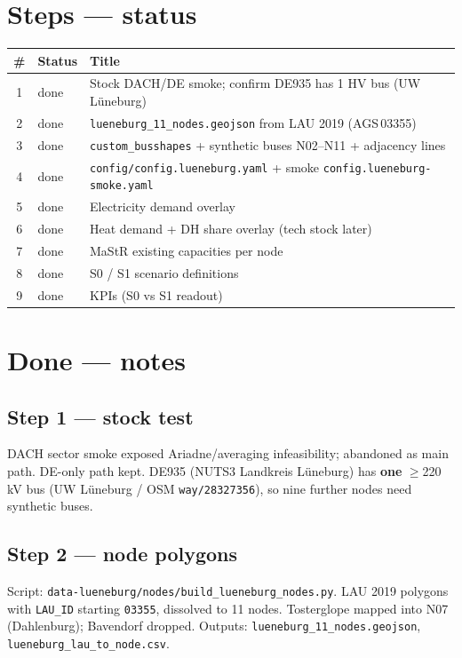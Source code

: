 \documentclass[11pt,a4paper]{article}
\begin{document}
\section{Steps --- status}

\begin{center}
\begin{tabular}{@{}clp{8cm}@{}}
\toprule
\# & Status & Title \\
\midrule
1 & done & Stock DACH/DE smoke; confirm DE935 has 1 HV bus (UW Lüneburg) \\
2 & done & \texttt{lueneburg\_11\_nodes.geojson} from LAU 2019 (AGS\,03355) \\
3 & done & \texttt{custom\_busshapes} + synthetic buses N02--N11 + adjacency lines \\
4 & done & \texttt{config/config.lueneburg.yaml} + smoke \texttt{config.lueneburg-smoke.yaml} \\
5 & done & Electricity demand overlay \\
6 & done & Heat demand + DH share overlay (tech stock later) \\
7 & done & MaStR existing capacities per node \\
8 & done & S0 / S1 scenario definitions \\
9 & done & KPIs (S0 vs S1 readout) \\
\bottomrule
\end{tabular}
\end{center}

\section{Done --- notes}

\subsection{Step 1 --- stock test}
DACH sector smoke exposed Ariadne/averaging infeasibility; abandoned as main path.
DE-only path kept. DE935 (NUTS3 Landkreis Lüneburg) has \textbf{one} $\ge$220\,kV bus
(UW Lüneburg / OSM \texttt{way/28327356}), so nine further nodes need synthetic buses.

\subsection{Step 2 --- node polygons}
Script: \texttt{data-lueneburg/nodes/build\_lueneburg\_nodes.py}.
LAU 2019 polygons with \texttt{LAU\_ID} starting \texttt{03355}, dissolved to 11 nodes.
Tosterglope mapped into N07 (Dahlenburg); Bavendorf dropped.
Outputs: \texttt{lueneburg\_11\_nodes.geojson}, \texttt{lueneburg\_lau\_to\_node.csv}.
\end{document}
